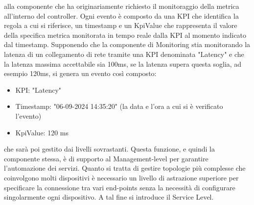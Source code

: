 alla componente che ha
originariamente richiesto il monitoraggio della metrica all'interno del controller.
\newline Ogni evento è composto da una KPI che identifica la regola a cui si riferisce, un timestamp e un KpiValue che rappresenta il valore della specifica metrica monitorata in tempo reale dalla KPI al momento indicato dal timestamp.
Supponendo che la componente di Monitoring stia monitorando la latenza di un collegamento di rete tramite una KPI denominata "Latency" e che la latenza massima accettabile sia 100ms,
se la latenza supera questa soglia, ad esempio 120ms, si genera un evento così composto: 
\begin{itemize}
    \item KPI: "Latency"
    \item Timestamp: "06-09-2024 14:35:20" (la data e l'ora a cui si è verificato l'evento)
    \item KpiValue: 120 ms
\end{itemize}
che sarà poi gestito dai livelli sovrastanti.
Questa funzione, e quindi la componente stessa, è di supporto al Management-level per garantire l'automazione dei servizi.
Quanto si tratta di gestire topologie più complesse che coinvolgono molti dispositivi è necessario un livello di astrazione superiore per specificare la connessione tra vari end-points
senza la necessità di configurare singolarmente ogni dispositivo. 
A tal fine si introduce il Service Level. 

